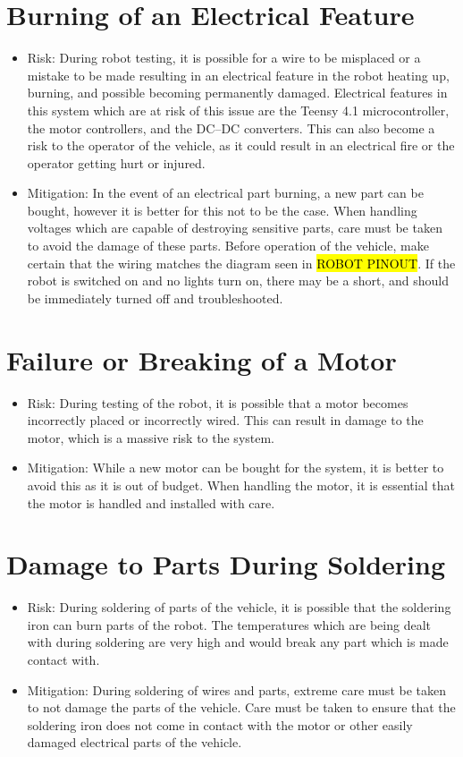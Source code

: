 \documentclass[11pt]{report}
\begin{document}
\section{Burning of an Electrical Feature}
\begin{itemize}
    \item Risk: During robot testing, it is possible for a wire to be misplaced or a mistake to be made resulting in an electrical feature in the robot heating up, burning, and possible becoming permanently damaged. Electrical features in this system which are at risk of this issue are the Teensy 4.1 microcontroller, the motor controllers, and the \gls{DC}--\gls{DC} converters. This can also become a risk to the operator of the vehicle, as it could result in an electrical fire or the operator getting hurt or injured.
    \item Mitigation: In the event of an electrical part burning, a new part can be bought, however it is better for this not to be the case. When handling voltages which are capable of destroying sensitive parts, care must be taken to avoid the damage of these parts. Before operation of the vehicle, make certain that the wiring matches the diagram seen in \hl{ROBOT PINOUT}. If the robot is switched on and no lights turn on, there may be a short, and should be immediately turned off and troubleshooted.
\end{itemize}
\section{Failure or Breaking of a Motor} 
\begin{itemize}
    \item Risk: During testing of the robot, it is possible that a motor becomes incorrectly placed or incorrectly wired. This can result in damage to the motor, which is a massive risk to the system.
    \item Mitigation: While a new motor can be bought for the system, it is better to avoid this as it is out of budget. When handling the motor, it is essential that the motor is handled and installed with care. 
\end{itemize}
\section{Damage to Parts During Soldering}
\begin{itemize}
    \item Risk: During soldering of parts of the vehicle, it is possible that the soldering iron can burn parts of the robot. The temperatures which are being dealt with during soldering are very high and would break any part which is made contact with. 
    \item Mitigation: During soldering of wires and parts, extreme care must be taken to not damage the parts of the vehicle. Care must be taken to ensure that the soldering iron does not come in contact with the motor or other easily damaged electrical parts of the vehicle.
\end{itemize}
\end{document}
